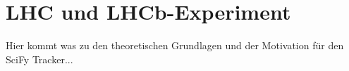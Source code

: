 \chapter{LHC und LHCb-Experiment}
Hier kommt was zu den theoretischen Grundlagen und der Motivation für den 
SciFy Tracker...

